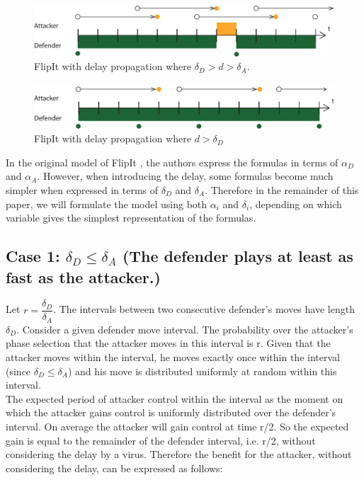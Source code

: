 \begin{figure}[hbtp]
\centering
\includegraphics[scale=0.7]{Images/FlipItCase1delay.pdf} 
\caption{FlipIt with delay propagation where $\delta_{D} > d > \delta_{A}$.   }
\label{langedelay}
\end{figure}

\begin{figure}[hbtp]
\centering
\includegraphics[scale=0.7]{Images/FlipItCase1delaytobig.pdf} 
\caption{FlipIt with delay propagation where $ d > \delta_{D}$ }
\label{langeredelay}
\end{figure}


In the original model of FlipIt \cite{FlipIt}, the authors express the formulas in terms of $\alpha_{D}$ and $\alpha_{A}$. However, when introducing the delay, some formulas become much simpler when expressed in terms of $\delta_{D}$ and $\delta_{A}$. Therefore in the remainder of this paper, we will formulate the model using both $\alpha_{i}$ and $\delta_{i}$, depending on which variable gives the simplest representation of the formulas.

\subsection*{\textbf{Case 1:} $\delta_{D} \leq \delta_{A} $ (The defender plays at least as fast as the attacker.) }

Let $r = \dfrac{\delta_{D}}{ \delta_{A} }$. The intervals between two consecutive defender's moves have length $\delta_{D}$. Consider a given defender move interval. The probability over the attacker's phase selection that the attacker moves in this interval is r. Given that the attacker moves within the interval, he moves exactly once within the interval (since $\delta_{D} \leq \delta_{A} $) and his move is distributed uniformly at random within this interval. \\

The expected period of attacker control within the interval as the moment on which the attacker gains control is uniformly distributed over the defender's interval. On average the attacker will gain control at time r/2. So the expected gain is equal to the remainder of the defender interval, i.e. r/2, without considering the delay by a virus. Therefore the benefit for the attacker, without considering the delay, can be expressed as follows:

